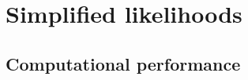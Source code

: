 
\chapter{Simplified likelihoods}\label{ch:simplify}

\ifpdf
    \graphicspath{{chapter-simplify/Figs/Raster/}{chapter-simplify/Figs/PDF/}{chapter-simplify/Figs/}}
\else
    \graphicspath{{chapter-simplify/Figs/Vector/}{chapter-simplify/Figs/}}
\fi



\section{Computational performance}\label{sec:cpu_performance}